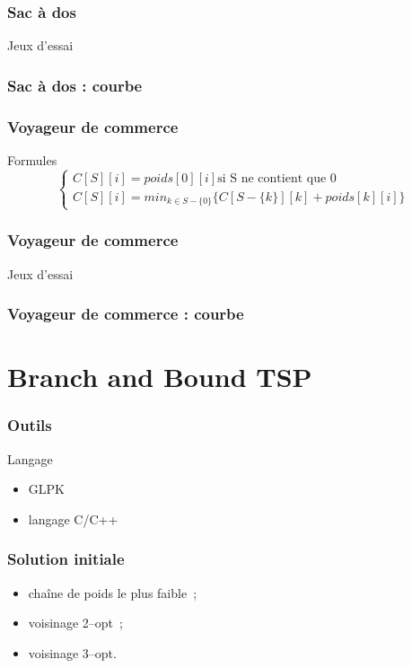 \documentclass[french]{beamer}
\begin{document}
\begin{frame}
\frametitle{Sac à dos}
\begin{block}{Jeux d'essai}

\end{block}
\end{frame}

\begin{frame}
\frametitle{Sac à dos : courbe}
\end{frame}

\begin{frame}
\frametitle{Voyageur de commerce}
\begin{alertblock}{Formules}
\begin{equation}
\begin{cases}
C[S][i] = poids[0][i] \text{si S ne contient que $0$} \\
C[S][i] = min_{k \in S - \{ 0 \}} \{ C[S- \{ k \}][k] + poids[k][i]  \}
\end{cases}
\end{equation}
\end{alertblock}
\end{frame}

\begin{frame}
\frametitle{Voyageur de commerce}
\begin{block}{Jeux d'essai}
\end{block}
\end{frame}

\begin{frame}
\frametitle{Voyageur de commerce : courbe}
\end{frame}

\section{Branch and Bound TSP}

\begin{frame}
\frametitle{Outils}
\begin{block}{Langage}
\begin{itemize}
\item GLPK
\item langage C/C++
\end{itemize}
\end{block}
\end{frame}

\begin{frame}
\frametitle{Solution initiale}
\begin{itemize}
\item chaîne de poids le plus faible~;
\item voisinage 2--opt~;
\item voisinage 3--opt.
\end{itemize}
\end{frame}
\end{document}
